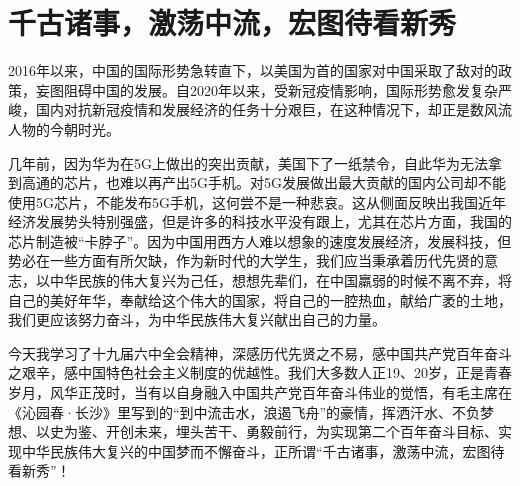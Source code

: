 \documentclass[12pt,a4paper]{ctexart}
\begin{document}
\section{\textbf{\Large{千古诸事，激荡中流，宏图待看新秀}}}
2016年以来，中国的国际形势急转直下，以美国为首的国家对中国采取了敌对的政策，妄图阻碍中国的发展。自2020年以来，受新冠疫情影响，国际形势愈发复杂严峻，国内对抗新冠疫情和发展经济的任务十分艰巨，在这种情况下，却正是数风流人物的今朝时光。

​几年前，因为华为在5G上做出的突出贡献，美国下了一纸禁令，自此华为无法拿到高通的芯片，也难以再产出5G手机。对5G发展做出最大贡献的国内公司却不能使用5G芯片，不能发布5G手机，这何尝不是一种悲哀。这从侧面反映出我国近年经济发展势头特别强盛，但是许多的科技水平没有跟上，尤其在芯片方面，我国的芯片制造被“卡脖子”。因为中国用西方人难以想象的速度发展经济，发展科技，但势必在一些方面有所欠缺，作为新时代的大学生，我们应当秉承着历代先贤的意志，以中华民族的伟大复兴为己任，想想先辈们，在中国羸弱的时候不离不弃，将自己的美好年华，奉献给这个伟大的国家，将自己的一腔热血，献给广袤的土地，我们更应该努力奋斗，为中华民族伟大复兴献出自己的力量。

​今天我学习了十九届六中全会精神，深感历代先贤之不易，感中国共产党百年奋斗之艰辛，感中国特色社会主义制度的优越性。我们大多数人正19、20岁，正是青春岁月，风华正茂时，当有以自身融入中国共产党百年奋斗伟业的觉悟，有毛主席在《沁园春·长沙》里写到的“到中流击水，浪遏飞舟”的豪情，挥洒汗水、不负梦想、以史为鉴、开创未来，埋头苦干、勇毅前行，为实现第二个百年奋斗目标、实现中华民族伟大复兴的中国梦而不懈奋斗，正所谓“千古诸事，激荡中流，宏图待看新秀”！
\end{document}
